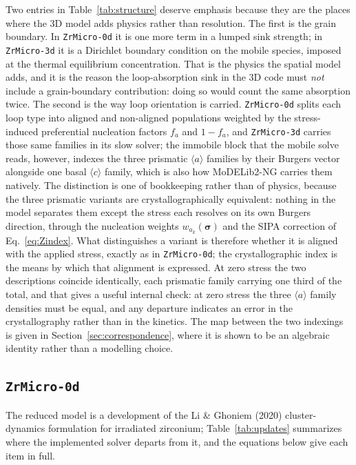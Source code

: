 \documentclass{article}
\newcommand{\aloop}{\ensuremath{\langle a\rangle}}
\newcommand{\cloop}{\ensuremath{\langle c\rangle}}
\newcommand{\ZrM}{\texttt{ZrMicro-3d}}
\newcommand{\ZrOd}{\texttt{ZrMicro-0d}}
\newcommand{\MoDNG}{\textsf{MoDELib2-NG}}
\begin{document}
Two entries in Table~\ref{tab:structure} deserve emphasis because they are the
places where the $3$D model adds physics rather than resolution. The first is the
grain boundary. In {\ZrOd} it is one more term in a lumped sink strength; in {\ZrM}
it is a Dirichlet boundary condition on the mobile species, imposed at the thermal
equilibrium concentration. That is the physics the spatial model adds, and it is
the reason the loop-absorption sink in the $3$D code must \emph{not} include a
grain-boundary contribution: doing so would count the same absorption twice. The
second is the way loop orientation is carried. {\ZrOd} splits each loop type into
aligned and non-aligned populations weighted by the stress-induced preferential
nucleation factors $f_a$ and $1-f_a$, and {\ZrM} carries those same families in
its slow solver; the immobile block that the mobile solve reads, however, indexes
the three prismatic \aloop{} families by their Burgers vector alongside one basal
\cloop{} family, which is also how {\MoDNG} carries them natively. The
distinction is one of bookkeeping rather than of physics, because the three
prismatic variants are crystallographically equivalent: nothing in the model
separates them except the stress each resolves on its own Burgers direction,
through the nucleation weights $w_{a_k}(\bm\sigma)$ and the SIPA correction of
Eq.~\eqref{eq:Zindex}. What distinguishes a variant is therefore whether it is
aligned with the applied stress, exactly as in {\ZrOd}; the crystallographic index
is the means by which that alignment is expressed. At zero stress the two
descriptions coincide identically, each prismatic family carrying one third of the
total, and that gives a useful internal check: at zero stress the three \aloop{}
family densities must be equal, and any departure indicates an error in the
crystallography rather than in the kinetics. The map between the two indexings is
given in Section~\ref{sec:correspondence}, where it is shown to be an algebraic
identity rather than a modelling choice.

\subsection{\ZrOd{}}
\label{app:A}\label{sec:coal}\label{sec:rhoN}\label{sec:loopcoupling}

The reduced model is a development of the Li \& Ghoniem (2020) cluster-dynamics
formulation for irradiated zirconium; Table~\ref{tab:updates} summarizes where the
implemented solver departs from it, and the equations below give each item in
full.
\end{document}
